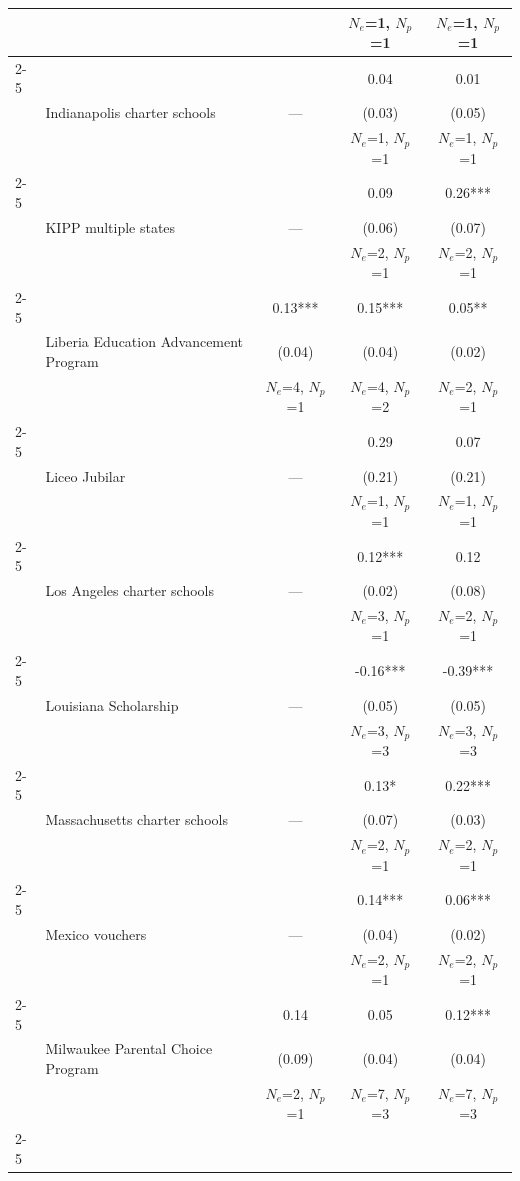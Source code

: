 \begin{longtable}{@{\extracolsep{\fill}} l l c c c @{}}
  &  &  & $N_e$=1, $N_p$=1 & $N_e$=1, $N_p$=1 \\
\cmidrule(lr){2-5}
  &  &  & 0.04 & 0.01 \\
  & Indianapolis charter schools & --- & (0.03) & (0.05) \\
  &  &  & $N_e$=1, $N_p$=1 & $N_e$=1, $N_p$=1 \\
\cmidrule(lr){2-5}
  &  &  & 0.09 & 0.26*** \\
  & KIPP multiple states & --- & (0.06) & (0.07) \\
  &  &  & $N_e$=2, $N_p$=1 & $N_e$=2, $N_p$=1 \\
\cmidrule(lr){2-5}
  &  & 0.13*** & 0.15*** & 0.05** \\
  & Liberia Education Advancement Program & (0.04) & (0.04) & (0.02) \\
  &  & $N_e$=4, $N_p$=1 & $N_e$=4, $N_p$=2 & $N_e$=2, $N_p$=1 \\
\cmidrule(lr){2-5}
  &  &  & 0.29 & 0.07 \\
  & Liceo Jubilar & --- & (0.21) & (0.21) \\
  &  &  & $N_e$=1, $N_p$=1 & $N_e$=1, $N_p$=1 \\
\cmidrule(lr){2-5}
  &  &  & 0.12*** & 0.12 \\
  & Los Angeles charter schools & --- & (0.02) & (0.08) \\
  &  &  & $N_e$=3, $N_p$=1 & $N_e$=2, $N_p$=1 \\
\cmidrule(lr){2-5}
  &  &  & -0.16*** & -0.39*** \\
  & Louisiana Scholarship & --- & (0.05) & (0.05) \\
  &  &  & $N_e$=3, $N_p$=3 & $N_e$=3, $N_p$=3 \\
\cmidrule(lr){2-5}
  &  &  & 0.13* & 0.22*** \\
  & Massachusetts charter schools & --- & (0.07) & (0.03) \\
  &  &  & $N_e$=2, $N_p$=1 & $N_e$=2, $N_p$=1 \\
\cmidrule(lr){2-5}
  &  &  & 0.14*** & 0.06*** \\
  & Mexico vouchers & --- & (0.04) & (0.02) \\
  &  &  & $N_e$=2, $N_p$=1 & $N_e$=2, $N_p$=1 \\
\cmidrule(lr){2-5}
  &  & 0.14 & 0.05 & 0.12*** \\
  & Milwaukee Parental Choice Program & (0.09) & (0.04) & (0.04) \\
  &  & $N_e$=2, $N_p$=1 & $N_e$=7, $N_p$=3 & $N_e$=7, $N_p$=3 \\
\cmidrule(lr){2-5}

\end{longtable}
